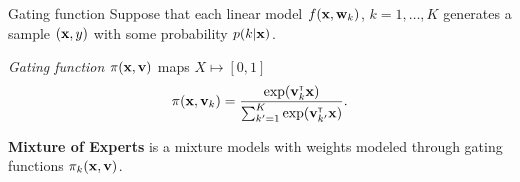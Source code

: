 \documentclass{beamer}
\newcommand{\argmax}{\mathop{\rm arg\,max}\limits}
\begin{document}
\begin{frame}{Gating function}
Suppose that each linear model $f({\mathbf{x}}, {\mathbf{w}}_k)$, $k=1,\dots, K$ generates a sample $({\mathbf{x}}, y)$ with some probability $p(k|{\mathbf{x}})$. \medskip

\emph{Gating function}  $\pi({\mathbf{x}}, \mathbf{v})$ maps $X \mapsto [0, 1]$
\[\pi({\mathbf{x}}, \mathbf{v}_k) = \frac{\exp(\mathbf{v}_k^{\text{\tiny\sffamily\upshape\mdseries T}}{\mathbf{x}})}{\sum_{k'=1}^K \exp(\mathbf{v}_{k'}^{\text{\tiny\sffamily\upshape\mdseries T}}{\mathbf{x}})}.\]

\begin{figure}
\end{figure}

\textbf{Mixture of Experts} is a mixture models with weights modeled through gating functions $\pi_k({\mathbf{x}}, \mathbf{v})$.
\end{frame}
\end{document}
